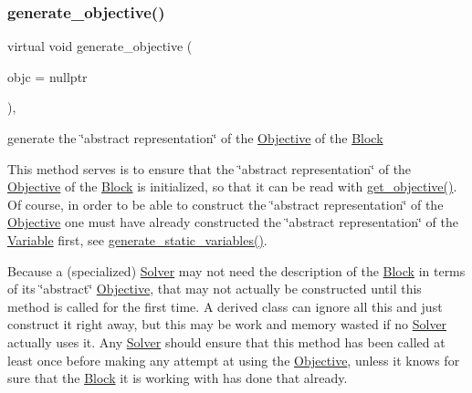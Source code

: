 \subsubsection{\texorpdfstring{generate\+\_\+objective()}{generate\_objective()}}
{\footnotesize\ttfamily virtual void generate\+\_\+objective (\begin{DoxyParamCaption}\item[{\mbox{\hyperlink{class_s_m_spp__di__unipi__it_1_1_configuration}{Configuration}} $\ast$}]{objc = {\ttfamily nullptr} }\end{DoxyParamCaption})\hspace{0.3cm}{\ttfamily [inline]}, {\ttfamily [virtual]}}



generate the \char`\"{}abstract representation\char`\"{} of the \mbox{\hyperlink{class_s_m_spp__di__unipi__it_1_1_objective}{Objective}} of the \mbox{\hyperlink{class_s_m_spp__di__unipi__it_1_1_block}{Block}} 

This method serves is to ensure that the \char`\"{}abstract representation\char`\"{} of the \mbox{\hyperlink{class_s_m_spp__di__unipi__it_1_1_objective}{Objective}} of the \mbox{\hyperlink{class_s_m_spp__di__unipi__it_1_1_block}{Block}} is initialized, so that it can be read with \mbox{\hyperlink{class_s_m_spp__di__unipi__it_1_1_block_afed5fdabb9a34885aaa38c3dd4e67834}{get\+\_\+objective()}}. Of course, in order to be able to construct the \char`\"{}abstract
representation\char`\"{} of the \mbox{\hyperlink{class_s_m_spp__di__unipi__it_1_1_objective}{Objective}} one must have already constructed the \char`\"{}abstract representation\char`\"{} of the \mbox{\hyperlink{class_s_m_spp__di__unipi__it_1_1_variable}{Variable}} first, see \mbox{\hyperlink{class_s_m_spp__di__unipi__it_1_1_block_acd79fd0980af547f2f06241cb989094e}{generate\+\_\+static\+\_\+variables()}}.

Because a (specialized) \mbox{\hyperlink{class_s_m_spp__di__unipi__it_1_1_solver}{Solver}} may not need the description of the \mbox{\hyperlink{class_s_m_spp__di__unipi__it_1_1_block}{Block}} in terms of its \char`\"{}abstract\char`\"{} \mbox{\hyperlink{class_s_m_spp__di__unipi__it_1_1_objective}{Objective}}, that may not actually be constructed until this method is called for the first time. A derived class can ignore all this and just construct it right away, but this may be work and memory wasted if no \mbox{\hyperlink{class_s_m_spp__di__unipi__it_1_1_solver}{Solver}} actually uses it. Any \mbox{\hyperlink{class_s_m_spp__di__unipi__it_1_1_solver}{Solver}} should ensure that this method has been called at least once before making any attempt at using the \mbox{\hyperlink{class_s_m_spp__di__unipi__it_1_1_objective}{Objective}}, unless it knows for sure that the \mbox{\hyperlink{class_s_m_spp__di__unipi__it_1_1_block}{Block}} it is working with has done that already.

